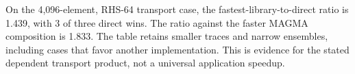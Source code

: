 On the 4,096-element, RHS-64 transport case, the fastest-library-to-direct ratio is 1.439, with 3 of three direct wins. The ratio against the faster MAGMA composition is 1.833. The table retains smaller traces and narrow ensembles, including cases that favor another implementation. This is evidence for the stated dependent transport product, not a universal application speedup.
